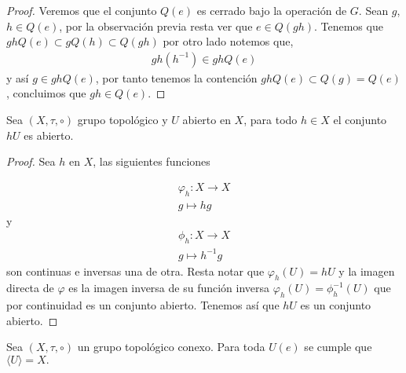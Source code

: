 \begin{proof}
 Veremos que el conjunto $Q(e)$ es cerrado bajo la operación de $G$. Sean $g$, $h \in Q(e)$, por la observación previa resta ver que $e \in Q(gh)$. Tenemos que $ ghQ(e) \subset gQ(h) \subset Q(gh)$ por otro lado notemos que, 
 \begin{align*}
 gh(h^{-1}) \in  ghQ(e)
 \end{align*}
 y así $g \in ghQ(e)$, por tanto tenemos la contención $ghQ(e) \subset Q(g)=Q(e)$, concluimos que $gh \in Q(e).$
 \end{proof}	
	
	
	
\begin{lm}\label{lm:gU_es_abierto}
Sea $(X,\tau, \circ)$ grupo topológico y $U$ abierto en $X$, para todo $h \in X$ el conjunto $hU$ es abierto.
\end{lm}

\begin{proof}
Sea $h$ en $X$, las siguientes funciones

\begin{align*}
\varphi_h:X \to X \\
g \mapsto hg
\end{align*}
y 
\begin{align*}
\phi_h:X \to X \\
g \mapsto h^{-1}g
\end{align*}
 son continuas e inversas una de otra. Resta notar que $\varphi_h(U)=hU$ y  la imagen directa de $\varphi$ es la imagen inversa de su función inversa  $\varphi_h(U)=\phi_h^{-1}(U)$ que por continuidad es un conjunto abierto.  Tenemos así que $hU$ es un conjunto abierto.

\end{proof}

\begin{pr} \label{pr:vec_de_la_id_gen}
Sea $(X, \tau, \circ)$ un grupo topológico conexo. Para toda $U(e)$ se cumple que $\langle U\rangle=X.$
\end{pr}
	

